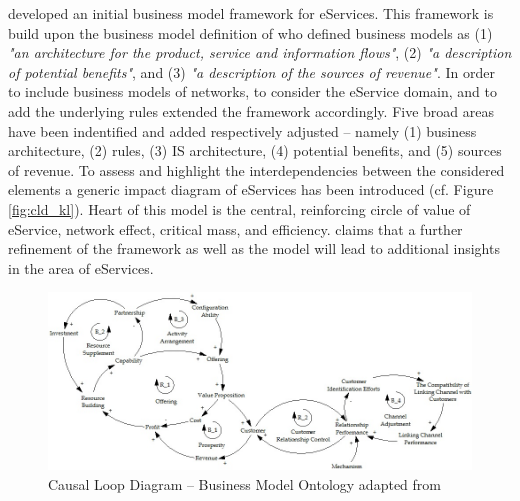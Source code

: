 \citet{Klueber2000} developed an initial business model framework for eServices. This framework is build upon the business model definition of \citet[p. 4]{Timmers1998} who defined business models as (1) \textit{"an architecture for the product, service and information flows"}, (2) \textit{"a description of potential benefits"}, and (3) \textit{"a description of the sources of revenue"}. In order to include business models of networks, to consider the eService domain, and to add the underlying rules \citet{Klueber2000} extended the framework accordingly. Five broad areas have been indentified and added respectively adjusted -- namely (1) business architecture, (2) rules, (3) \ac{IS} architecture, (4) potential benefits, and (5) sources of revenue. To assess and highlight the interdependencies between the considered elements a generic impact diagram of eServices has been introduced (cf. Figure \ref{fig:cld_kl}). Heart of this model is the central, reinforcing circle of value of eService, network effect, critical mass, and efficiency. \citet{Klueber2000} claims that a further refinement of the framework as well as the model will lead to additional insights in the area of eServices. 

\begin{figure}[t]
	\centering
	\includegraphics[width=\textwidth]{gfx/cld_kiani}
	\caption[Causal Loop Diagram -- Business Model Ontology]{Causal Loop Diagram -- Business Model Ontology adapted from \citet[p. 164]{Kiani2009}}
	\label{fig:cld_ki}
\end{figure}

